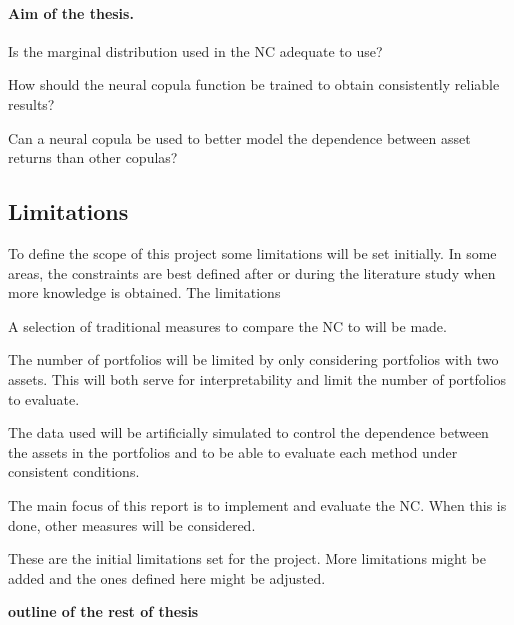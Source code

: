 \paragraph*{Aim of the thesis.}
\begin{compactenum}[{\bfseries RQ}1]
    \item \label{item:RQ1} Is the marginal distribution used in the \gls{NC} adequate to use?
    \item \label{item:RQ2} How should the neural copula function be trained to obtain consistently reliable results?
    \item \label{item:RQ3} Can a neural copula be used to better model the dependence between asset returns than other copulas?
    
\end{compactenum}
\newcommand{\RQone}{{\bfseries RQ}\ref{item:RQ1}}
\newcommand{\RQtwo}{{\bfseries RQ}\ref{item:RQ2}}
\newcommand{\RQthree}{{\bfseries RQ}\ref{item:RQ3}}


\subsection{Limitations}
To define the scope of this project some limitations will be set initially. In some areas, the constraints are best defined after or during the literature study when more knowledge is obtained. The limitations 


\begin{compactenum}
    \item A selection of traditional measures to compare the \gls{NC} to will be made. 

    \item The number of portfolios will be limited by only considering portfolios with two assets. This will both serve for interpretability and limit the number of portfolios to evaluate. 

    \item The data used will be artificially simulated to control the dependence between the assets in the portfolios and to be able to evaluate each method under consistent conditions. 

    \item The main focus of this report is to implement and evaluate the \gls{NC}. When this is done, other measures will be considered. 
    
\end{compactenum}

These are the initial limitations set for the project. More limitations might be added and the ones defined here might be adjusted.   










\textbf{outline of the rest of thesis} 